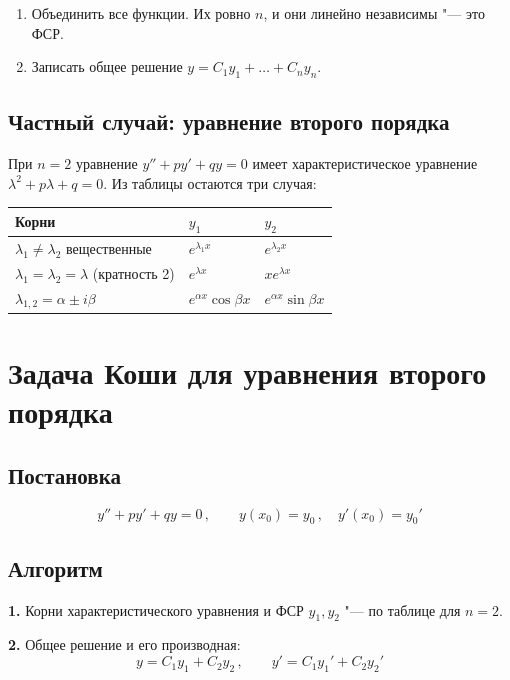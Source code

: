 \documentclass[11pt,a4paper]{article}
\begin{document}
\begin{enumerate}[resume]
  \item Объединить все функции. Их ровно $n$, и они линейно независимы "--- это ФСР.
  \item Записать общее решение $y = C_1 y_1 + \dots + C_n y_n$.
\end{enumerate}

\subsection*{Частный случай: уравнение второго порядка}

При $n = 2$ уравнение $y'' + py' + qy = 0$ имеет характеристическое уравнение $\lambda^2 + p\lambda + q = 0$. Из таблицы остаются три случая:
\begin{center}
\begin{tabular}{@{}lll@{}}
\toprule
Корни & $y_1$ & $y_2$\\
\midrule
$\lambda_1 \ne \lambda_2$ вещественные & $e^{\lambda_1 x}$ & $e^{\lambda_2 x}$\\
$\lambda_1 = \lambda_2 = \lambda$ (кратность 2) & $e^{\lambda x}$ & $x e^{\lambda x}$\\
$\lambda_{1,2} = \alpha \pm i\beta$ & $e^{\alpha x}\cos\beta x$ & $e^{\alpha x}\sin\beta x$\\
\bottomrule
\end{tabular}
\end{center}

\section*{Задача Коши для уравнения второго порядка}

\subsection*{Постановка}

\[
  y'' + py' + qy = 0\,, \qquad y(x_0) = y_0\,, \quad y'(x_0) = y_0'
\]

\subsection*{Алгоритм}

\textbf{1.} Корни характеристического уравнения и ФСР $y_1, y_2$ "--- по таблице для $n = 2$.

\textbf{2.} Общее решение и его производная:
\[
  y = C_1 y_1 + C_2 y_2\,, \qquad y' = C_1 y_1' + C_2 y_2'
\]
\end{document}
